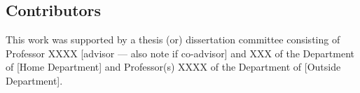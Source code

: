 %
%
%
%



\begin{contributors}



%
%
% 
%
%
%
%
%

\subsection*{Contributors}
This work was supported by a thesis (or) dissertation committee consisting of Professor XXXX [advisor --– also note if co-advisor] and XXX of the Department of [Home Department] and Professor(s) XXXX of the Department of [Outside Department].


\end{contributors}
